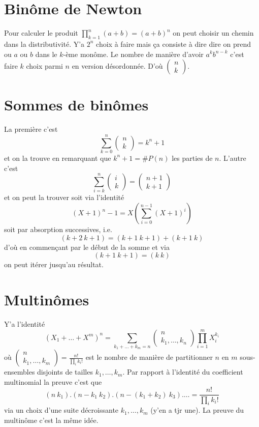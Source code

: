 \documentclass[a4paper,12pt]{book}
\theoremstyle{plain}
\theoremstyle{definition}
\theoremstyle{remark}
\begin{document}
\section{Binôme de Newton}
Pour calculer le produit $\prod_{k=1}^n(a+b)=(a+b)^n$ on 
peut choisir un chemin dans la distributivité. Y'a $2^n$ choix
à faire mais ça consiste à dire dire on prend ou $a$ ou $b$
dans le $k$-ème monôme. Le nombre de manière d'avoir $a^kb^{n-k}$
c'est faire $k$ choix parmi $n$ en version désordonnée. D'où
$\begin{pmatrix}n\\k\end{pmatrix}$.

\section{Sommes de binômes}
La première c'est 
\[\sum_{k=0}^n \begin{pmatrix}n\\ k\end{pmatrix}=k^n+1\]
et on la trouve en remarquant que $k^n+1=\#P(n)$ les parties
de $n$. L'autre c'est
\[\sum_{i=k}^n\begin{pmatrix}i\\ k\end{pmatrix}=\begin{pmatrix}n+1\\ k+1\end{pmatrix}\]
et on peut la trouver soit via l'identité
\[(X+1)^n-1=X(\sum_{i=0}^{n-1} (X+1)^i)\]
soit par absorption successives, i.e. 
\[(k+2~k+1)=(k+1~k+1)+(k+1~k)\]
d'où en commençant par le début de la somme et via
\[(k+1~k+1)=(k~k)\]
on peut itérer jusqu'au résultat.

\section{Multinômes}
Y'a l'identité
\[(X_1+\ldots+X^m)^n=\sum_{k_1+\ldots+k_m=n}\begin{pmatrix}n\\k_1,\ldots,k_n\end{pmatrix}\prod_{i=1}^m X_i^{k_i}\]
où $\begin{pmatrix}n\\k_1,\ldots,k_m\end{pmatrix}=\frac{n!}{\prod_i k_i!}$ est le nombre de manière de
partitionner $n$ en $m$ sous-ensembles disjoints de tailles $k_1,\ldots, k_m$. Par rapport
à l'identité du coefficient multinomial la preuve c'est que 
\[(n~k_1).(n-k_1~k_2).(n-(k_1+k_2)~k_3).\ldots=\frac{n!}{\prod_i k_i!}\]
via un choix d'une suite décroissante $k_1,\ldots, k_m$ (y'en a tjr une).
La preuve du multinôme c'est la même idée.
\end{document}
